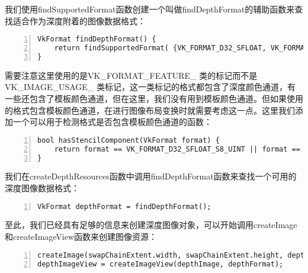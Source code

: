 \documentclass{ctexart}
\begin{document}
我们使用findSupportedFormat函数创建一个叫做findDepthFormat的辅助函数来查找适合作为深度附着的图像数据格式：

\begin{lstlisting}[language={[ANSI]C},keywordstyle=\color{blue!70},commentstyle=\color{red!50!green!50!blue!50},frame=shadowbox, rulesepcolor=\color{red!20!green!20!blue!20},basicstyle=\small,numbers=left, numberstyle=\tiny,breaklines=true]
VkFormat findDepthFormat() {
	return findSupportedFormat( {VK_FORMAT_D32_SFLOAT, VK_FORMAT_D32_SFLOAT_S8_UINT, VK_FORMAT_D24_UNORM_S8_UINT}, VK_IMAGE_TILING_OPTIMAL, VK_FORMAT_FEATURE_DEPTH_STENCIL_ATTACHMENT_BIT);
}
\end{lstlisting}

需要注意这里使用的是VK\_FORMAT\_FEATURE\_ 类的标记而不是VK\_IMAGE\_USAGE\_ 类标记，这一类标记的格式都包含了深度颜色通道，有一些还包含了模板颜色通道，但在这里，我们没有用到模板颜色通道。但如果使用的格式包含模板颜色通道，在进行图像布局变换时就需要考虑这一点。这里我们添加一个可以用于检测格式是否包含模板颜色通道的函数：

\begin{lstlisting}[language={[ANSI]C},keywordstyle=\color{blue!70},commentstyle=\color{red!50!green!50!blue!50},frame=shadowbox, rulesepcolor=\color{red!20!green!20!blue!20},basicstyle=\small,numbers=left, numberstyle=\tiny,breaklines=true]
bool hasStencilComponent(VkFormat format) {
	return format == VK_FORMAT_D32_SFLOAT_S8_UINT || format == VK_FORMAT_D24_UNORM_S8_UINT;
}
\end{lstlisting}

我们在createDepthResources函数中调用findDepthFormat函数来查找一个可用的深度图像数据格式：

\begin{lstlisting}[language={[ANSI]C},keywordstyle=\color{blue!70},commentstyle=\color{red!50!green!50!blue!50},frame=shadowbox, rulesepcolor=\color{red!20!green!20!blue!20},basicstyle=\small,numbers=left, numberstyle=\tiny,breaklines=true]
VkFormat depthFormat = findDepthFormat();
\end{lstlisting}

至此，我们已经具有足够的信息来创建深度图像对象，可以开始调用createImage和createImageView函数来创建图像资源：

\begin{lstlisting}[language={[ANSI]C},keywordstyle=\color{blue!70},commentstyle=\color{red!50!green!50!blue!50},frame=shadowbox, rulesepcolor=\color{red!20!green!20!blue!20},basicstyle=\small,numbers=left, numberstyle=\tiny,breaklines=true]
createImage(swapChainExtent.width, swapChainExtent.height, depthFormat, VK_IMAGE_TILING_OPTIMAL, VK_IMAGE_USAGE_DEPTH_STENCIL_ATTACHMENT_BIT, VK_MEMORY_PROPERTY_DEVICE_LOCAL_BIT, depthImage, depthImageMemory);
depthImageView = createImageView(depthImage, depthFormat);
\end{lstlisting}
\end{document}
